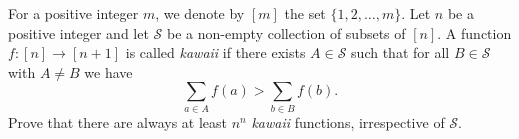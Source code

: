 For a positive integer $m$, we denote by $[m]$ the set $\{1, 2, \dots, m\}$.
Let $n$ be a positive integer and let $\mathcal{S}$ be a non-empty collection of subsets of $[n]$.
A function $f\colon [n] \to [n+1]$ is called \emph{kawaii} if
there exists $A \in \mathcal{S}$ such that for all $B \in \mathcal{S}$ with $A \neq B$ we have 
$$\sum_{a \in A} f(a) > \sum_{b \in B} f(b).$$
Prove that there are always at least $n^n$ \emph{kawaii} functions, irrespective of $\mathcal{S}$.
